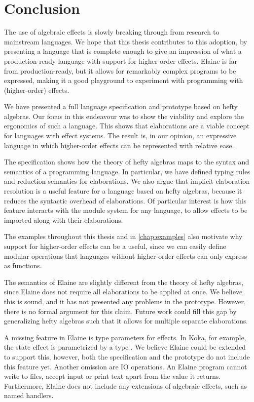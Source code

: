 \chapter{Conclusion}\label{chap:conclusion}

The use of algebraic effects is slowly breaking through from research to mainstream languages. We hope that this thesis contributes to this adoption, by presenting a language that is complete enough to give an impression of what a production-ready language with support for higher-order effects. Elaine is far from production-ready, but it allows for remarkably complex programs to be expressed, making it a good playground to experiment with programming with (higher-order) effects.

We have presented a full language specification and prototype based on hefty algebras. Our focus in this endeavour was to show the viability and explore the ergonomics of such a language. This shows that elaborations are a viable concept for languages with effect systems. The result is, in our opinion, an expressive language in which higher-order effects can be represented with relative ease.

The specification shows how the theory of hefty algebras maps to the syntax and semantics of a programming language. In particular, we have defined typing rules and reduction semantics for elaborations. We also argue that implicit elaboration resolution is a useful feature for a language based on hefty algebras, because it reduces the syntactic overhead of elaborations. Of particular interest is how this feature interacts with the module system for any language, to allow effects to be imported along with their elaborations.

The examples throughout this thesis and in \cref{chap:examples} also motivate why support for higher-order effects can be a useful, since we can easily define modular operations that languages without higher-order effects can only express as functions.

The semantics of Elaine are slightly different from the theory of hefty algebras, since Elaine does not require all elaborations to be applied at once. We believe this is sound, and it has not presented any problems in the prototype. However, there is no formal argument for this claim. Future work could fill this gap by generalizing hefty algebras such that it allows for multiple separate elaborations.

A missing feature in Elaine is type parameters for effects. In Koka, for example, the state effect  is parametrized by a type . We believe Elaine could be extended to support this, however, both the specification and the prototype do not include this feature yet. Another omission are IO operations. An Elaine program cannot write to files, accept input or print text apart from the value it returns. Furthermore, Elaine does not include any extensions of algebraic effects, such as named handlers.


